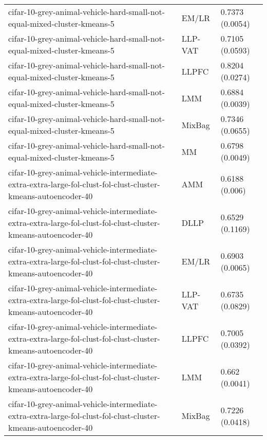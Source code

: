 \begin{longtable}{lll}
                                     cifar-10-grey-animal-vehicle-hard-small-not-equal-mixed-cluster-kmeans-5 &     EM/LR &                       0.7373 (0.0054) \\
                                     cifar-10-grey-animal-vehicle-hard-small-not-equal-mixed-cluster-kmeans-5 &   LLP-VAT &                       0.7105 (0.0593) \\
                                     cifar-10-grey-animal-vehicle-hard-small-not-equal-mixed-cluster-kmeans-5 &     LLPFC &                       0.8204 (0.0274) \\
                                     cifar-10-grey-animal-vehicle-hard-small-not-equal-mixed-cluster-kmeans-5 &       LMM &                       0.6884 (0.0039) \\
                                     cifar-10-grey-animal-vehicle-hard-small-not-equal-mixed-cluster-kmeans-5 &    MixBag &                       0.7346 (0.0655) \\
                                     cifar-10-grey-animal-vehicle-hard-small-not-equal-mixed-cluster-kmeans-5 &        MM &                       0.6798 (0.0049) \\
cifar-10-grey-animal-vehicle-intermediate-extra-extra-large-fol-clust-fol-clust-cluster-kmeans-autoencoder-40 &       AMM &                        0.6188 (0.006) \\
cifar-10-grey-animal-vehicle-intermediate-extra-extra-large-fol-clust-fol-clust-cluster-kmeans-autoencoder-40 &      DLLP &                       0.6529 (0.1169) \\
cifar-10-grey-animal-vehicle-intermediate-extra-extra-large-fol-clust-fol-clust-cluster-kmeans-autoencoder-40 &     EM/LR &                       0.6903 (0.0065) \\
cifar-10-grey-animal-vehicle-intermediate-extra-extra-large-fol-clust-fol-clust-cluster-kmeans-autoencoder-40 &   LLP-VAT &                       0.6735 (0.0829) \\
cifar-10-grey-animal-vehicle-intermediate-extra-extra-large-fol-clust-fol-clust-cluster-kmeans-autoencoder-40 &     LLPFC &                       0.7005 (0.0392) \\
cifar-10-grey-animal-vehicle-intermediate-extra-extra-large-fol-clust-fol-clust-cluster-kmeans-autoencoder-40 &       LMM &                        0.662 (0.0041) \\
cifar-10-grey-animal-vehicle-intermediate-extra-extra-large-fol-clust-fol-clust-cluster-kmeans-autoencoder-40 &    MixBag &                       0.7226 (0.0418) \\

\end{longtable}
